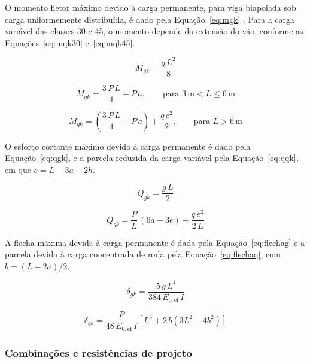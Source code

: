 O momento fletor máximo devido à carga permanente, para viga biapoiada sob carga uniformemente distribuída, é dado pela Equação~\eqref{eq:mgk} \parencite{CALIL2006}. Para a carga variável das classes 30 e 45, o momento depende da extensão do vão, conforme as Equações~\eqref{eq:mqk30} e~\eqref{eq:mqk45}.

\begin{equation}
M_{gk} = \frac{q\,L^2}{8}
\label{eq:mgk}
\end{equation}

\begin{equation}
M_{qk} = \frac{3\,P\,L}{4} - P\,a, \qquad \text{para } 3\,\text{m} < L \leq 6\,\text{m}
\label{eq:mqk30}
\end{equation}

\begin{equation}
M_{qk} = \left(\frac{3\,P\,L}{4} - P\,a\right) + \frac{q\,c^2}{2}, \qquad \text{para } L > 6\,\text{m}
\label{eq:mqk45}
\end{equation}

O esforço cortante máximo devido à carga permanente é dado pela Equação~\eqref{eq:qgk}, e a parcela reduzida da carga variável pela Equação~\eqref{eq:qqk}, em que $e = L - 3a - 2h$.

\begin{equation}
Q_{gk} = \frac{g\,L}{2}
\label{eq:qgk}
\end{equation}

\begin{equation}
Q_{qk} = \frac{P}{L}\,(6a + 3e) + \frac{q\,e^2}{2\,L}
\label{eq:qqk}
\end{equation}

A flecha máxima devida à carga permanente é dada pela Equação~\eqref{eq:flechag} e a parcela devida à carga concentrada de roda pela Equação~\eqref{eq:flechaq}, com $b = (L-2a)/2$.

\begin{equation}
\delta_{gk} = \frac{5\,g\,L^4}{384\,E_{0,\mathrm{ef}}\,I}
\label{eq:flechag}
\end{equation}

\begin{equation}
\delta_{qk} = \frac{P}{48\,E_{0,\mathrm{ef}}\,I}\left[L^3 + 2\,b\left(3L^2 - 4b^2\right)\right]
\label{eq:flechaq}
\end{equation}

\subsubsection{Combinações e resistências de projeto}

